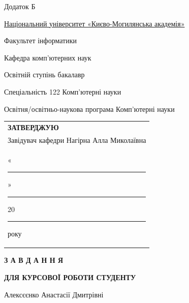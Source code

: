 \begin{flushright}
Додаток Б
\end{flushright}

\begin{center}
\underline{Національний університет «Києво-Могилянська академія»}
\end{center}

\vspace{0.5cm}

\noindent Факультет {інформатики\hspace{10.3cm}}
\vspace{0.3cm}

\noindent Кафедра {комп'ютерних наук\hspace{9.3cm}}
\vspace{0.3cm}

\noindent Освітній ступінь {бакалавр\hspace{9.6cm}}
\vspace{0.3cm}

\noindent Спеціальність {122 Комп'ютерні науки\hspace{7.5cm}}
\vspace{0.3cm}

\noindent Освітня/освітньо-наукова програма {Комп'ютерні науки\hspace{8.6cm}}
\vspace{0.3cm}

\begin{flushright}
\begin{tabular}{l}
\textbf{ЗАТВЕРДЖУЮ} \\[0.3cm]
Завідувач кафедри Нагірна Алла Миколаївна \\[0.5cm]
«\rule{0.8cm}{0.4pt}» \rule{3cm}{0.4pt} 20\rule{0.8cm}{0.4pt} року
\end{tabular}
\end{flushright}

\vspace{0.5cm}

\begin{center}
\textbf{З А В Д А Н Н Я}

\textbf{ДЛЯ КУРСОВОЇ РОБОТИ СТУДЕНТУ}

\vspace{0.3cm}

{Алексєєнко Анастасії Дмитрівні\hspace{2.5cm}}
\end{center}

\vspace{0.3cm}

